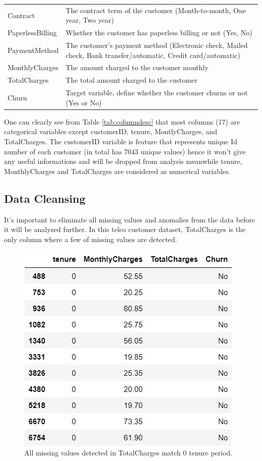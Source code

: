 \begin{longtable}{p{}p{}}
 Contract & The contract term of the customer (Month-to-month, One year, Two year)\\
 PaperlessBilling & Whether the customer has paperless billing or not (Yes, No)\\
 PaymentMethod & The customer’s payment method (Electronic check, Mailed check, Bank transfer/automatic, Credit card/automatic)\\
 MonthlyCharges & The amount charged to the customer monthly\\
TotalCharges & The total amount charged to the customer\\
 Churn &Target variable, define whether the customer churns or not (Yes or No)\\ \hline
\end{longtable}
One can clearly see from Table \ref{tab:columndesc} that most columns (17) are categorical variables except customerID, tenure, MontlyCharges, and TotalCharges. The customerID variable is feature that represents unique Id number of each customer (in total has 7043 unique values) hence it won't give any useful informations and will be dropped from analysis  meanwhile tenure, MonthlyCharges and TotalCharges are considered as numerical variables.



\subsection{Data Cleansing}
It's important to eliminate all missing values and anomalies from the data before it will be analyzed further. In this telco customer dataset, TotalCharges is the only column where a few of missing values are detected.
\begin{figure}[tbph]
	\centering
	\includegraphics[width=0.6\linewidth]{figures/miss_values}
	\caption{All missing values detected in TotalCharges match 0 tenure period.}
	\label{fig:missvalues}
\end{figure}

